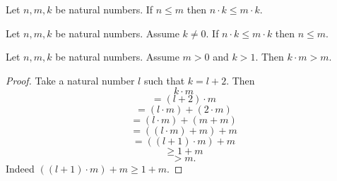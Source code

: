 \documentclass[10pt]{article}
\begin{document}
  \begin{forthel}
    \begin{corollary}[id=ARITHMETIC_06_8946886668976128,printid]
      Let $n, m, k$ be natural numbers.
      If $n \leq m$ then $n \cdot k \leq m \cdot k$.
    \end{corollary}
  \end{forthel}

  \begin{forthel}
    \begin{corollary}[id=ARITHMETIC_06_4374428949413888,printid]
      Let $n, m, k$ be natural numbers.
      Assume $k \neq 0$.
      If $n \cdot k \leq m \cdot k$ then $n \leq m$.
    \end{corollary}
  \end{forthel}

  \begin{forthel}
    \begin{proposition}[id=ARITHMETIC_06_8813409145454592,printid]
      Let $n, m, k$ be natural numbers.
      Assume $m > 0$ and $k > 1$.
      Then $k \cdot m > m$.
    \end{proposition}
    \begin{proof}
      Take a natural number $l$ such that $k = l + 2$.
      Then
      \[  k \cdot m                       \]
      \[    = (l + 2) \cdot m             \]
      \[    = (l \cdot m) + (2 \cdot m)   \]
      \[    = (l \cdot m) + (m + m)       \]
      \[    = ((l \cdot m) + m) + m       \]
      \[    = ((l + 1) \cdot m) + m       \]
      \[    \geq 1 + m                    \]
      \[    > m.                          \]
      Indeed $((l + 1) \cdot m) + m \geq 1 + m$.
    \end{proof}
  \end{forthel}
\end{document}
